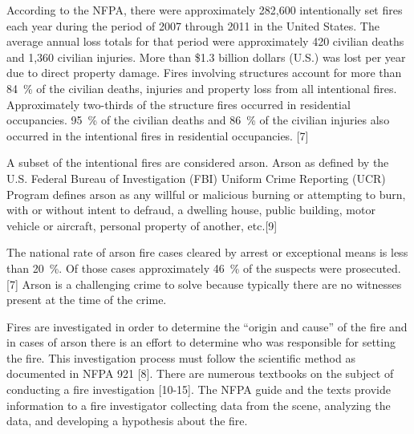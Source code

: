 \documentclass[twoside]{uocthesis}
\begin{document}
According to the NFPA, there were approximately 282,600 intentionally set fires each year during the period of 2007 through 2011 in the United States. The average annual loss totals for that period were approximately 420 civilian deaths and 1,360 civilian injuries. More than \$1.3 billion dollars (U.S.) was lost per year due to direct property damage. Fires involving structures account for more than 84~\% of the civilian deaths, injuries and property loss from all intentional fires.  Approximately two-thirds of the structure fires occurred in residential occupancies.  95~\% of the civilian deaths and 86~\% of the civilian injuries also occurred in the intentional fires in residential occupancies. [7]

A subset of the intentional fires are considered arson.  Arson as defined by the U.S. Federal Bureau of Investigation (FBI) Uniform Crime Reporting (UCR) Program defines arson as any willful or malicious burning or attempting to burn, with or without intent to defraud, a dwelling house, public building, motor vehicle or aircraft, personal property of another, etc.[9]

The national rate of arson fire cases cleared by arrest or exceptional means is less than 20~\%.  Of those cases approximately 46~\% of the suspects were prosecuted.[7] Arson is a challenging crime to solve because typically there are no witnesses present at the time of the crime. 
  
Fires are investigated in order to determine the ``origin and cause'' of the fire and in cases of arson there is an effort to determine who was responsible for setting the fire.  This investigation process must follow the scientific method as documented in NFPA 921 [8].  There are numerous textbooks on the subject of conducting a fire investigation [10-15]. The NFPA guide and the texts provide information to a fire investigator collecting data from the scene, analyzing the data, and developing a hypothesis about the fire.   
 
\end{document}

